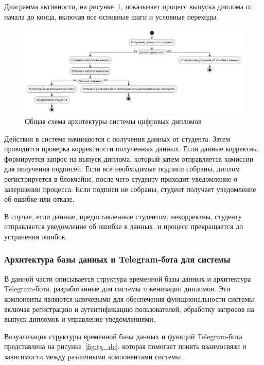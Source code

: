 Диаграмма активности, на рисунке~\ref{fig:ifcs}, показывает процесс выпуска диплома от начала до конца, включая все основные шаги и условные переходы.
\begin{figure}[H]
	\centering
	\includegraphics[width=.9\textwidth]{images/ifcs.png}
	\parskip=6pt
	\caption{Общая схема архитектуры системы цифровых дипломов}
	\label{fig:ifcs}
\end{figure}

Действия в системе начинаются с получения данных от студента. Затем проводится проверка корректности полученных данных. Если данные корректны, формируется запрос на выпуск диплома, который затем отправляется комиссии для получения подписей. Если все необходимые подписи собраны, диплом регистрируется в блокчейне, после чего студенту приходит уведомление о завершении процесса. Если подписи не собраны, студент получает уведомление об ошибке или отказе.

В случае, если данные, предоставленные студентом, некорректны, студенту отправляется уведомление об ошибке в данных, и процесс прекращается до устранения ошибок.

\subsubsection{Архитектура базы данных и Telegram-бота для системы}

В данной части описывается структура временной базы данных и архитектура Telegram-бота, разработанные для системы токенизации дипломов. Эти компоненты являются ключевыми для обеспечения функциональности системы, включая регистрацию и аутентификацию пользователей, обработку запросов на выпуск дипломов и управление уведомлениями.

Визуализация структуры временной базы данных и функций Telegram-бота представлена на рисунке~\ref{fig:tg_dc}, которая помогает понять взаимосвязи и зависимости между различными компонентами системы.

